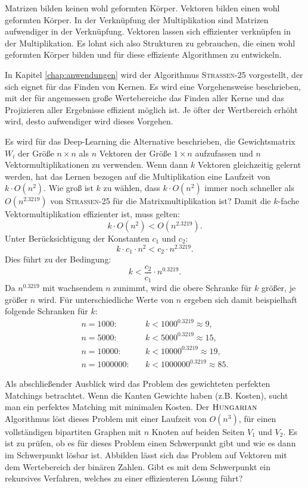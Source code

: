 \documentclass{report}
\numberwithin{equation}{section}
\begin{document}
Matrizen bilden keinen wohl geformten Körper. Vektoren bilden einen wohl geformten Körper. In der Verknüpfung der Multiplikation sind Matrizen aufwendiger in der Verknüpfung. Vektoren lassen sich effizienter verknüpfen in der Multiplikation. Es lohnt sich also Strukturen zu gebrauchen, die einen wohl geformten Körper bilden und für diese effiziente Algorithmen zu entwickeln.

In Kapitel \ref{chap:anwendungen} wird der Algorithmus \textsc{Strassen-25} vorgestellt, der sich eignet für das Finden von Kernen. Es wird eine Vorgehensweise beschrieben, mit der für angemessen große Wertebereiche das Finden aller Kerne und das Projizieren aller Ergebnisse effizient möglich ist. Je öfter der Wertbereich erhöht wird, desto aufwendiger wird dieses Vorgehen.

Es wird für das Deep-Learning die Alternative beschrieben, die Gewichtsmatrix $W_i$ der Größe $n \times n$ als $n$ Vektoren der Größe $1 \times n$ aufzufassen und $n$ Vektormultiplikationen zu verwenden. Wenn dann $k$ Vektoren gleichzeitig gelernt werden, hat das Lernen bezogen auf die Multiplikation eine Laufzeit von $k \cdot O(n^2)$. Wie groß ist $k$ zu wählen, dass $k \cdot O(n^2)$ immer noch schneller als $O(n^{2.3219})$ von \textsc{Strassen-25} für die Matrixmultiplikation ist? Damit die $k$-fache Vektormultiplikation effizienter ist, muss gelten:
$$k \cdot O(n^2) < O(n^{2.3219}).$$
Unter Berücksichtigung der Konstanten $c_1$ und $c_2$:
$$k \cdot c_1 \cdot n^2 < c_2 \cdot n^{2.3219}.$$
Dies führt zu der Bedingung:
$$k < \frac{c_2}{c_1} \cdot n^{0.3219}.$$
Da $n^{0.3219}$ mit wachsendem $n$ zunimmt, wird die obere Schranke für $k$ größer, je größer $n$ wird. Für unterschiedliche Werte von $n$ ergeben sich damit beispielhaft folgende Schranken für $k$:
\begin{align*}
	n = 1000: \quad & k < 1000^{0.3219} \approx 9, \\
	n = 5000: \quad & k < 5000^{0.3219} \approx 15, \\
	n = 10000: \quad & k < 10000^{0.3219} \approx 19, \\
	n = 1000000: \quad & k < 1000000^{0.3219} \approx 85.
\end{align*}

Als abschließender Ausblick wird das Problem des gewichteten perfekten Matchings betrachtet. Wenn die Kanten Gewichte haben (z.B. Kosten), sucht man ein perfektes Matching mit minimalen Kosten. Der $\textsc{Hungarian}$ Algorithmus löst dieses Problem mit einer Laufzeit von $O(n^3)$, für einen vollständigen bipartiten Graphen mit $n$ Knoten auf beiden Seiten $V_1$ und $V_2$. Es ist zu prüfen, ob es für dieses Problem einen Schwerpunkt gibt und wie es dann im Schwerpunkt lösbar ist. Abbilden lässt sich das Problem auf Vektoren mit dem Wertebereich der binären Zahlen. Gibt es mit dem Schwerpunkt ein rekursives Verfahren, welches zu einer effizienteren Lösung führt?
\end{document}
